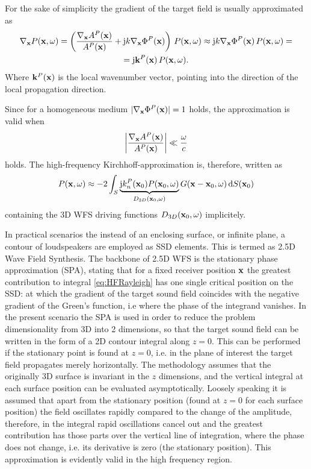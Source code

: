 \documentclass[11pt]{article}
\begin{document}
For the sake of simplicity the gradient of the target field is usually approximated as
\begin{multline}
    \nabla_{\mathbf{x}}  P(\mathbf{x},\omega)  = \left( \frac{\nabla_{\mathbf{x}} A^P(\mathbf{x})}{A^P(\mathbf{x})} + \mathrm{j} k \nabla_{\mathbf{x}} \Phi^P(\mathbf{x}) \right)\, P(\mathbf{x},\omega) \approx 
    \mathrm{j} k \nabla_{\mathbf{x}} \Phi^P(\mathbf{x}) \, P(\mathbf{x},\omega)
    = \\ = \mathrm{j} \mathbf{k}^P(\mathbf{x}) \, P(\mathbf{x},\omega).
\end{multline}
Where $\mathbf{k}^P(\mathbf{x})$ is the local wavenumber vector, pointing into the direction of the local propagation direction.

Since for a homogeneous medium $|\nabla_{\mathbf{x}} \Phi^P(\mathbf{x})| = 1$ holds, the approximation is valid when 
\begin{equation}
   \left| \frac{\nabla_{\mathbf{x}} A^P(\mathbf{x})}{A^P(\mathbf{x})}  \right| \ll \frac{\omega}{c}
   \label{eq:HFgradientValidity}
\end{equation}
holds.
The high-frequency Kirchhoff-approximation is, therefore, written as
\begin{equation}
    P(\mathbf{x},\omega) \approx -2 \int_S \underbrace{ \mathrm{j} k_n^P(\mathbf{x}_0) P(\mathbf{x}_0,\omega)}_{D_{3D}(\mathbf{x}_0,\omega)} G(\mathbf{x}-\mathbf{x}_0,\omega) \, \mathrm{d} S(\mathbf{x}_0) 
    \label{eq:HFRayleigh}
\end{equation}
containing the 3D WFS driving functions $D_{3D}(\mathbf{x}_0,\omega)$ implicitely.


\vspace{2mm}
In practical scenarios the instead of an enclosing surface, or infinite plane, a contour of loudspeakers are employed as SSD elements.
This is termed as 2.5D Wave Field Synthesis.
The backbone of 2.5D WFS is the stationary phase approximation (SPA), stating that for a fixed receiver position $\mathbf{x}$ the greatest contribution to integral \eqref{eq:HFRayleigh} has one single critical position on the SSD: at which the gradient of the target sound field coincides with the negative gradient of the Green's function, i.e where the phase of the integrand vanishes.
In the present scenario the SPA is used in order to reduce the problem dimensionality from 3D into 2 dimensions, so that the target sound field can be written in the form of a 2D contour integral along $z=0$.
This can be performed if the stationary point is found at $z=0$, i.e. in the plane of interest the target field propagates merely horizontally.
The methodology assumes that the originally 3D surface is invariant in the $z$ dimensions, and the vertical integral at each surface position can be evaluated asymptotically.
Loosely speaking it is assumed that apart from the stationary position (found at $z=0$ for each surface position) the field oscillates rapidly compared to the change of the amplitude, therefore, in the integral rapid oscillations cancel out and the greatest contribution has those parts over the vertical line of integration, where the phase does not change, i.e. its derivative is zero (the stationary position).
This approximation is evidently valid in the high frequency region.
\end{document}
